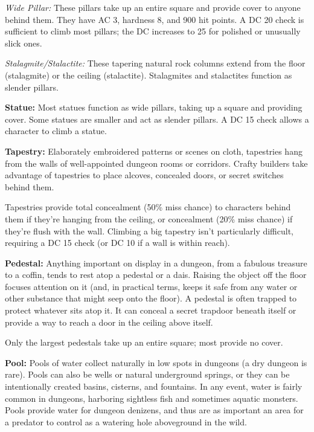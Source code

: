 \textit{Wide Pillar:} These pillars take up an entire square and provide cover to anyone behind them. They have AC 3, hardness 8, and 900 hit points. A DC 20  check is sufficient to climb most pillars; the DC increases to 25 for polished or unusually slick ones.

\textit{Stalagmite/Stalactite:} These tapering natural rock columns extend from the floor (stalagmite) or the ceiling (stalactite). Stalagmites and stalactites function as slender pillars.

\textbf{Statue:} Most statues function as wide pillars, taking up a square and providing cover. Some statues are smaller and act as slender pillars. A DC 15  check allows a character to climb a statue.

\textbf{Tapestry:} Elaborately embroidered patterns or scenes on cloth, tapestries hang from the walls of well-appointed dungeon rooms or corridors. Crafty builders take advantage of tapestries to place alcoves, concealed doors, or secret switches behind them.

Tapestries provide total concealment (50\% miss chance) to characters behind them if they're hanging from the ceiling, or concealment (20\% miss chance) if they're flush with the wall. Climbing a big tapestry isn't particularly difficult, requiring a DC 15  check (or DC 10 if a wall is within reach).

\textbf{Pedestal:} Anything important on display in a dungeon, from a fabulous treasure to a coffin, tends to rest atop a pedestal or a dais. Raising the object off the floor focuses attention on it (and, in practical terms, keeps it safe from any water or other substance that might seep onto the floor). A pedestal is often trapped to protect whatever sits atop it. It can conceal a secret trapdoor beneath itself or provide a way to reach a door in the ceiling above itself.

Only the largest pedestals take up an entire square; most provide no cover.

\textbf{Pool:} Pools of water collect naturally in low spots in dungeons (a dry dungeon is rare). Pools can also be wells or natural underground springs, or they can be intentionally created basins, cisterns, and fountains. In any event, water is fairly common in dungeons, harboring sightless fish and sometimes aquatic monsters. Pools provide water for dungeon denizens, and thus are as important an area for a predator to control as a watering hole aboveground in the wild.

